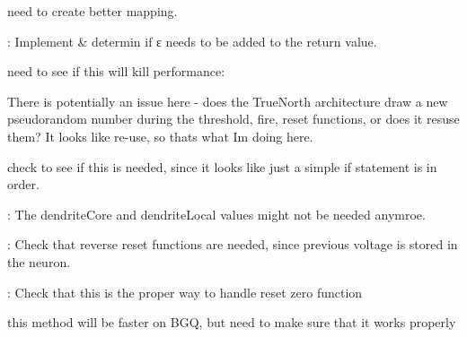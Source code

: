 
\begin{DoxyRefList}
\item[\label{todo__todo000004}%
\hypertarget{todo__todo000004}{}%
global\+Scope$>$ Global \hyperlink{model__main_8h_a614c89653e656c2b0436bed7f2c8de3e}{create\+L\+Ps} ()]need to create better mapping.  
\item[\label{todo__todo000001}%
\hypertarget{todo__todo000001}{}%
global\+Scope$>$ Global \hyperlink{assist_8h_a4d378196b7fceed090d64ec8820b4065}{get\+Current\+Big\+Tick} (tw\+\_\+stime now)]\+: Implement \& determin if ε needs to be added to the return value.

need to see if this will kill performance\+:  
\item[\label{todo__todo000007}%
\hypertarget{todo__todo000007}{}%
global\+Scope$>$ Global \hyperlink{neuron_8h_aabaff47eadb1e61b34c19b6e982f6511}{neuron\+Post\+Integrate} (\hyperlink{structneuron_state}{neuron\+State} $\ast$st, tw\+\_\+stime time, tw\+\_\+lp $\ast$lp, bool will\+Fire)]There is potentially an issue here -\/ does the True\+North architecture draw a new pseudorandom number during the threshold, fire, reset functions, or does it resuse them? It looks like re-\/use, so that\textquotesingle{}s what I\textquotesingle{}m doing here.  
\item[\label{todo__todo000008}%
\hypertarget{todo__todo000008}{}%
global\+Scope$>$ Global \hyperlink{neuron_8h_a3520b013e0c2f711b9f5c16e19306be6}{neuron\+Should\+Fire} (\hyperlink{structneuron_state}{neuron\+State} $\ast$st, tw\+\_\+lp $\ast$lp)]check to see if this is needed, since it looks like just a simple if statement is in order. 
\item[\label{todo__todo000009}%
\hypertarget{todo__todo000009}{}%
Global \hyperlink{structneuron_state_a4199c14c5aabfd52f441e01623bdc84c}{neuron\+State\+:\+:dendrite\+Global\+Dest} ]\+: The dendrite\+Core and dendrite\+Local values might not be needed anymroe.  
\item[\label{todo__todo000005}%
\hypertarget{todo__todo000005}{}%
Module \hyperlink{neuron_8c_amgrpb71b6f136d39fa6c989fa9f8bce28fa9}{Reset\+Functions} ]\+: Check that reverse reset functions are needed, since previous voltage is stored in the neuron.  
\item[\label{todo__todo000006}%
\hypertarget{todo__todo000006}{}%
global\+Scope$>$ Global \hyperlink{neuron_8h_ae53276ccdb759ba1ea09806cbf9fc940}{reverse\+Reset\+Zero} (void $\ast$neuron\+State)]\+: Check that this is the proper way to handle reset zero function  
\item[\label{todo__todo000003}%
\hypertarget{todo__todo000003}{}%
global\+Scope$>$ Global \hyperlink{assist_8h_ad383c153e77508e2556003da0e4ac3eb}{R\+Z\+E\+R} (a)]this method will be faster on B\+G\+Q, but need to make sure that it works properly 
\end{DoxyRefList}